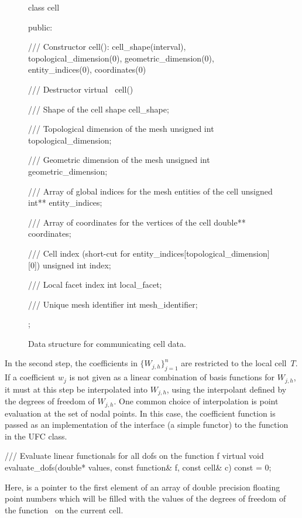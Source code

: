 \begin{figure}
\begin{c++}
class cell
{
public:

  /// Constructor
  cell(): cell_shape(interval),
          topological_dimension(0), geometric_dimension(0),
          entity_indices(0), coordinates(0) {}

  /// Destructor
  virtual ~cell() {}

  /// Shape of the cell
  shape cell_shape;

  /// Topological dimension of the mesh
  unsigned int topological_dimension;

  /// Geometric dimension of the mesh
  unsigned int geometric_dimension;

  /// Array of global indices for the mesh entities of the cell
  unsigned int** entity_indices;

  /// Array of coordinates for the vertices of the cell
  double** coordinates;

  /// Cell index (short-cut for entity_indices[topological_dimension][0])
  unsigned int index;

  /// Local facet index
  int local_facet;

  /// Unique mesh identifier
  int mesh_identifier;

};
\end{c++}
\caption{Data structure for communicating cell data.}
\label{fig:cellcode}
\end{figure}

In the second step, the coefficients in $\{W_{j,h}\}_{j=1}^n$ are
restricted to the local cell~$T$. If a coefficient $w_j$ is not given
as a linear combination of basis functions for $W_{j,h}$, it must at
this step be interpolated into $W_{j,h}$, using the interpolant
defined by the degrees of freedom of $W_{j,h}$. One common choice of
interpolation is point evaluation at the set of nodal points. In this
case, the coefficient function is passed as an implementation of the
 interface (a simple functor) to the
function~ in the UFC  class.

\begin{c++}
/// Evaluate linear functionals for all dofs on the function f
virtual void evaluate_dofs(double* values,
                           const function& f,
                           const cell& c) const = 0;
\end{c++}
Here,  is a pointer to the first element of an
array of double precision floating point numbers which will be filled
with the values of the degrees of freedom of the function~ on
the current cell.

